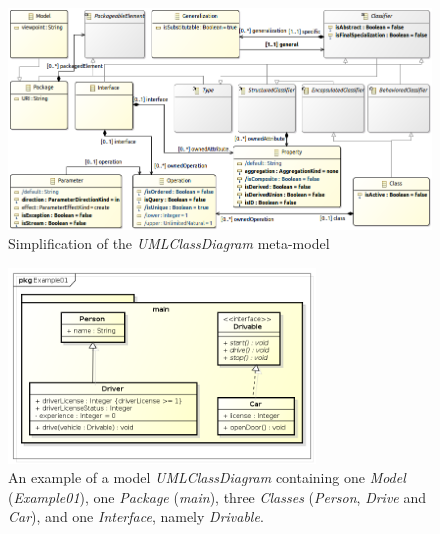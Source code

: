 \documentclass[tuberlin,cic,tc,english,noabntcite]{iiufrgs}
\begin{document}
\begin{figure}[H]
    \caption{Simplification of the \emph{UMLClassDiagram} meta-model}
    \begin{center}
        \includegraphics[width=\textwidth]{umlClassDiagramSimple01}
    \end{center}
    \label{fig:uml_metamodel_class}
\end{figure}
\begin{figure}[h]
    \caption{An example of a model \emph{UMLClassDiagram} containing one \emph{Model} (\emph{Example01}), one \emph{Package} (\emph{main}), three \emph{Classes} (\emph{Person}, \emph{Drive} and \emph{Car}), and one \emph{Interface}, namely \emph{Drivable}.}
    \begin{center}
        \includegraphics[width=22em]{umlClassDiagramExample01}
    \end{center}
    \label{fig:uml_metamodel_class_example}
\end{figure}

\end{document}
